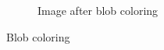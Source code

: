 \documentclass[12pt]{article}
\begin{document}
\begin{figure}
\begin{subfigure}[b]{0.475\textwidth}
		\caption[]%
		{{\small Image after blob coloring}}    
		\label{fig:blocks_result}
	\end{subfigure}
	\caption[ ]
	{\small Blob coloring} 
	\label{fig:blocks_temp}
\end{figure}
\end{document}
